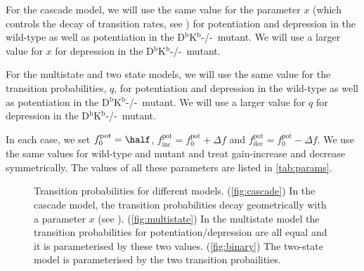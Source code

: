 \documentclass[12pt]{article}
\newcommand{\pot}{^{\text{pot}}}
\newcommand{\norm}{_0}
\newcommand{\inc}{_{\text{inc}}}
\newcommand{\dec}{_{\text{dec}}}
\newcommand{\KO}{D$^\mathrm{b}$K$^\mathrm{b}$-/-}
\begin{document}
For the cascade model, we will use the same value for the parameter $x$ (which controls the decay of transition rates, see \cite{Fusi2005cascade}) for potentiation and depression in the wild-type as well as potentiation in the \KO\ mutant.
We will use a larger value for $x$ for depression in the \KO\ mutant.

For the multistate and two state models, we will use the same value for the transition probabilities, $q$, for potentiation and depression in the wild-type as well as potentiation in the \KO\ mutant.
We will use a larger value for $q$ for depression in the \KO\ mutant.

In each case, we set $f\pot\norm=\half$, $f\pot\inc=f\pot\norm+\Delta f$ and $f\pot\dec=f\pot\norm-\Delta f$.
We use the same values for wild-type and mutant and treat gain-increase and decrease symmetrically.
The values of all these parameters are listed in \autoref{tab:params}.

\begin{figure}
 \begin{center}
 \begin{myenuma}
  \item{}\label{fig:cascade}\hspace{0.5cm}
  \item{}\label{fig:multistate}\hspace{0.5cm}
  \item{}\label{fig:binary}
 \end{myenuma}
 \end{center}
  \caption{Transition probabilities for different models.
  (\ref{fig:cascade}) In the cascade model, the transition probabilities decay geometrically with a parameter $x$ (see \cite{Fusi2005cascade}).
  (\ref{fig:multistate}) In the multistate model the transition probabilities for potentiation/depression are all equal and it is parameterised by these two values.
  (\ref{fig:binary}) The two-state model is parameterised by the two transition probailities.} \label{fig:models}
\end{figure}
\end{document}
